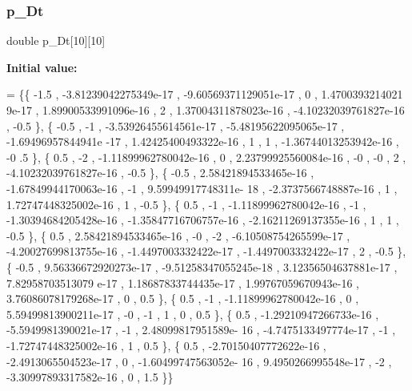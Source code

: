 \subsubsection{\texorpdfstring{p\+\_\+\+Dt}{p\_Dt}}
{\footnotesize\ttfamily double p\+\_\+\+Dt\mbox{[}10\mbox{]}\mbox{[}10\mbox{]}}

{\bfseries Initial value\+:}
\begin{DoxyCode}
= \{\{             -1.5 , -3.81239042275349e-17 , -9.60569371129051e-17 ,                 0 , 1.4700393214021
      9e-17 , 1.89900533991096e-16 ,                 2 , 1.37004311878023e-16 , -4.10232039761827e-16 ,           
         -0.5 \},
\{             -0.5 ,                -1 , -3.53926455614561e-17 , -5.48195622095065e-17 , -1.69496957844941e
      -17 , 1.42425400493322e-16 ,                 1 ,                 1 , -1.36744013253942e-16 ,              -0
      .5 \},
\{              0.5 ,                -2 , -1.11899962780042e-16 ,                 0 , 2.23799925560084e-16 ,
                      -0 ,                -0 ,                 2 , -4.10232039761827e-16 ,              -0.5 \},
\{             -0.5 , 2.58421894533465e-16 , -1.67849944170063e-16 ,                -1 , 9.59949917748311e-
      18 , -2.3737566748887e-16 ,                 1 , 1.72747448325002e-16 ,                 1 ,              -0.5 
      \},
\{              0.5 ,                -1 , -1.11899962780042e-16 ,                -1 , -1.30394684205428e-16 
      , -1.35847716706757e-16 , -2.16211269137355e-16 ,                 1 ,                 1 ,              -0.5 
      \},
\{              0.5 , 2.58421894533465e-16 ,                -0 ,                -2 , -6.10508754265599e-17 ,
       -4.20027699813755e-16 , -1.4497003332422e-17 , -1.4497003332422e-17 ,                 2 ,              -0.5
       \},
\{             -0.5 , 9.56336672920273e-17 , -9.51258347055245e-18 , 3.12356504637881e-17 , 7.82958703513079
      e-17 , 1.18687833744435e-17 , 1.99767059670943e-16 , 3.76086078179268e-17 ,                 0 ,             
        0.5 \},
\{              0.5 ,                -1 , -1.11899962780042e-16 ,                 0 , 5.59499813900211e-17 ,
                      -0 ,                -1 ,                 1 ,                 0 ,               0.5 \},
\{              0.5 , -1.29210947266733e-16 , -5.5949981390021e-17 ,                -1 , 2.48099817951589e-
      16 , -4.7475133497774e-17 ,                -1 , -1.72747448325002e-16 ,                 1 ,               0.5
       \},
\{              0.5 , -2.70150407772622e-16 , -2.4913065504523e-17 ,                 0 , -1.60499747563052e-
      16 , 9.4950266995548e-17 ,                -2 , -3.30997893317582e-16 ,                 0 ,               1.5
       \}\}
\end{DoxyCode}
\mbox{\label{a00482_a0c9aea0754df0fd04aa5c79c1a985dd5}} 
